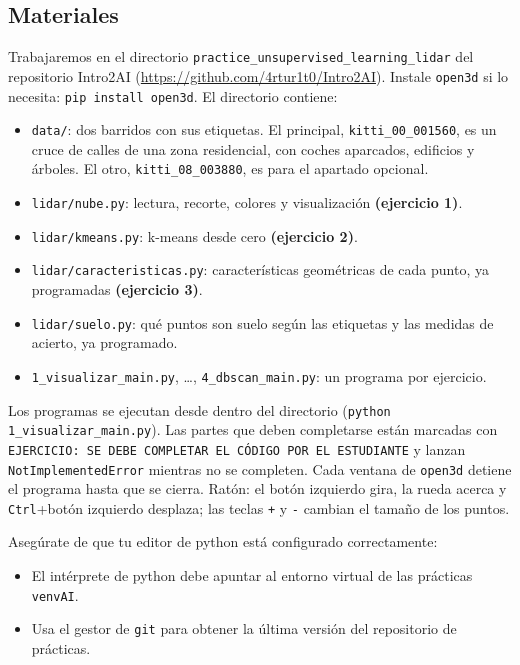 \documentclass{article}
\begin{document}
\subsection{Materiales}
Trabajaremos en el directorio \texttt{practice\_unsupervised\_learning\_lidar} del repositorio Intro2AI (\url{https://github.com/4rtur1t0/Intro2AI}). Instale \texttt{open3d} si lo necesita: \texttt{pip install open3d}. El directorio contiene:
\begin{itemize}
    \item \texttt{data/}: dos barridos con sus etiquetas. El principal, \texttt{kitti\_00\_001560}, es un cruce de calles de una zona residencial, con coches aparcados, edificios y árboles. El otro, \texttt{kitti\_08\_003880}, es para el apartado opcional.
    \item \texttt{lidar/nube.py}: lectura, recorte, colores y visualización \textbf{(ejercicio 1)}.
    \item \texttt{lidar/kmeans.py}: k-means desde cero \textbf{(ejercicio 2)}.
    \item \texttt{lidar/caracteristicas.py}: características geométricas de cada punto, ya programadas \textbf{(ejercicio 3)}.
    \item \texttt{lidar/suelo.py}: qué puntos son suelo según las etiquetas y las medidas de acierto, ya programado.
    \item \texttt{1\_visualizar\_main.py}, \dots, \texttt{4\_dbscan\_main.py}: un programa por ejercicio.
\end{itemize}
Los programas se ejecutan desde dentro del directorio (\texttt{python 1\_visualizar\_main.py}). Las partes que deben completarse están marcadas con \texttt{EJERCICIO: SE DEBE COMPLETAR EL CÓDIGO POR EL ESTUDIANTE} y lanzan \texttt{NotImplementedError} mientras no se completen. Cada ventana de \texttt{open3d} detiene el programa hasta que se cierra. Ratón: el botón izquierdo gira, la rueda acerca y \texttt{Ctrl}+botón izquierdo desplaza; las teclas \texttt{+} y \texttt{-} cambian el tamaño de los puntos.

\begin{tcolorbox}[colback=yellow!8!white, colframe=orange!70!black, title=\textbf{Antes de comenzar}]
Asegúrate de que tu editor de python está configurado correctamente:
\begin{itemize}
\item El intérprete de python debe apuntar al entorno virtual de las prácticas \texttt{venvAI}.
\item Usa el gestor de \texttt{git} para obtener la última versión del repositorio de prácticas.
\end{itemize}
\end{tcolorbox}
\end{document}
